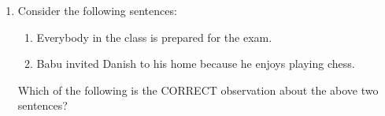 \documentclass[journal,12pt,onecolumn]{IEEEtran}
\theoremstyle{remark}
\begin{document}
\begin{enumerate}
		
		\item Consider the following sentences:
		\begin{enumerate}
			\item {}Everybody in the class is prepared for the exam.
			\item {}Babu invited Danish to his home because he enjoys playing chess.
		\end{enumerate}
		Which of the following is the CORRECT observation about the above two sentences?
		

\end{enumerate}
\end{document}
